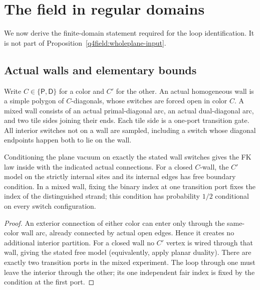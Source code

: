 \section{The field in regular domains}
\label{sec:q4regular}

We now derive the finite-domain statement required for the loop
identification.  It is not part of
Proposition~\ref{q4field:wholeplane-input}.

\subsection{Actual walls and elementary bounds}

Write $C\in\{\mathsf P,\mathsf D\}$ for a color and $C'$ for the other.
An actual homogeneous wall is a simple polygon of $C$-diagonals,
whose switches are forced open in color $C$.  A mixed wall consists
of an actual primal-diagonal arc, an actual dual-diagonal arc, and two
tile sides joining their ends.  Each tile side is a one-port
transition gate.  All interior switches not on a wall are sampled,
including a switch whose diagonal endpoints happen both to lie on
the wall.

\begin{lemma}\label{q4field:wall-law}
Conditioning the plane vacuum on exactly the stated wall switches
gives the FK law inside with the indicated actual connections.
For a closed $C$-wall, the $C'$ model on the strictly internal sites
and its internal edges has free boundary condition.
In a mixed wall, fixing the binary index at one transition port fixes
the index of the distinguished strand; this condition has probability
$1/2$ conditional on every switch configuration.
\end{lemma}

\begin{proof}
An exterior connection of either color can enter only through the
same-color wall arc, already connected by actual open edges.  Hence
it creates no additional interior partition.  For a closed wall no
$C'$ vertex is wired through that wall, giving the stated free model
(equivalently, apply planar duality).  There are exactly two transition
ports in the mixed experiment.  The loop through one must leave the
interior through the other; its one independent fair index is fixed
by the condition at the first port.
\end{proof}

